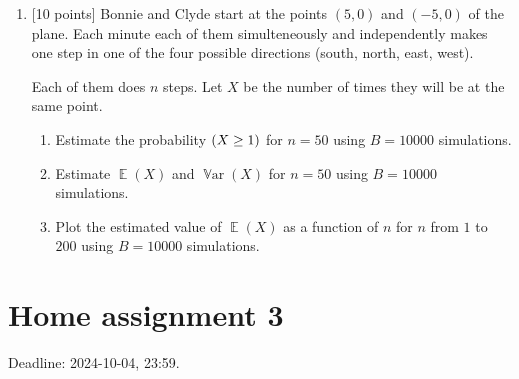 \documentclass[12pt]{article}
\DeclareMathOperator{\Var}{\mathbb{V}ar}
\let\P\relax
\DeclareMathOperator{\P}{\mathbb{P}}
\DeclareMathOperator{\E}{\mathbb{E}}
\begin{document}
\begin{enumerate}
    \item {[10 points]} Bonnie and Clyde start at the points $(5, 0)$ and $(-5, 0)$ of the plane. 
    Each minute each of them simulteneously and independently makes one step in one of the four possible directions (south, north, east, west).

    Each of them does $n$ steps.
    Let $X$ be the number of times they will be at the same point.
    \begin{enumerate}
        \item Estimate the probability $\P(X \geq 1)$ for $n=50$ using $B=10000$ simulations. 
        \item Estimate $\E(X)$ and $\Var(X)$ for $n=50$ using $B=10000$ simulations. 
        \item Plot the estimated value of $\E(X)$ as a function of $n$ for $n$ from $1$ to $200$ using $B=10000$ simulations. 
    \end{enumerate}

\end{enumerate}




\section*{Home assignment 3}

Deadline: 2024-10-04, 23:59.
\end{document}
